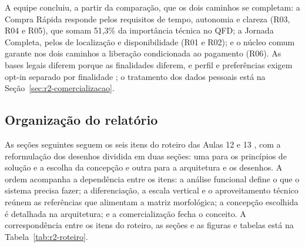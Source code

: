 A equipe concluiu, a partir da comparação, que os dois caminhos se completam: a Compra Rápida responde pelos requisitos de tempo, autonomia e clareza (R03, R04 e R05), que somam 51,3\% da importância técnica no QFD; a Jornada Completa, pelos de localização e disponibilidade (R01 e R02); e o núcleo comum garante nos dois caminhos a liberação condicionada ao pagamento (R06). As bases legais diferem porque as finalidades diferem, e perfil e preferências exigem opt-in separado por finalidade \cite{brasil2018lgpd}; o tratamento dos dados pessoais está na Seção~\ref{sec:r2-comercializacao}.

\subsection{Organização do relatório}
\label{sub:r2-organizacao}

As seções seguintes seguem os seis itens do roteiro das Aulas 12 e 13 \cite{zancul2026conceitual}, com a reformulação dos desenhos dividida em duas seções: uma para os princípios de solução e a escolha da concepção e outra para a arquitetura e os desenhos. A ordem acompanha a dependência entre os itens: a análise funcional define o que o sistema precisa fazer; a diferenciação, a escala vertical e o aproveitamento técnico reúnem as referências que alimentam a matriz morfológica; a concepção escolhida é detalhada na arquitetura; e a comercialização fecha o conceito. A correspondência entre os itens do roteiro, as seções e as figuras e tabelas está na Tabela~\ref{tab:r2-roteiro}.

